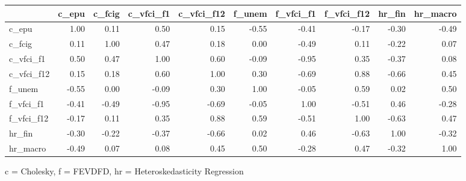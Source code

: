 

\begin{tabular*}{\linewidth}{@{\extracolsep{\fill}}l|rrrrrrrrr}
\toprule
 & c\_epu & c\_fcig & c\_vfci\_f1 & c\_vfci\_f12 & f\_unem & f\_vfci\_f1 & f\_vfci\_f12 & hr\_fin & hr\_macro \\ 
\midrule\addlinespace[2.5pt]
c\_epu & 1.00 & 0.11 & 0.50 & 0.15 & -0.55 & -0.41 & -0.17 & -0.30 & -0.49 \\ 
c\_fcig & 0.11 & 1.00 & 0.47 & 0.18 & 0.00 & -0.49 & 0.11 & -0.22 & 0.07 \\ 
c\_vfci\_f1 & 0.50 & 0.47 & 1.00 & 0.60 & -0.09 & -0.95 & 0.35 & -0.37 & 0.08 \\ 
c\_vfci\_f12 & 0.15 & 0.18 & 0.60 & 1.00 & 0.30 & -0.69 & 0.88 & -0.66 & 0.45 \\ 
f\_unem & -0.55 & 0.00 & -0.09 & 0.30 & 1.00 & -0.05 & 0.59 & 0.02 & 0.50 \\ 
f\_vfci\_f1 & -0.41 & -0.49 & -0.95 & -0.69 & -0.05 & 1.00 & -0.51 & 0.46 & -0.28 \\ 
f\_vfci\_f12 & -0.17 & 0.11 & 0.35 & 0.88 & 0.59 & -0.51 & 1.00 & -0.63 & 0.47 \\ 
hr\_fin & -0.30 & -0.22 & -0.37 & -0.66 & 0.02 & 0.46 & -0.63 & 1.00 & -0.32 \\ 
hr\_macro & -0.49 & 0.07 & 0.08 & 0.45 & 0.50 & -0.28 & 0.47 & -0.32 & 1.00 \\ 
\bottomrule
\end{tabular*}
\begin{minipage}{\linewidth}
c = Cholesky, f = FEVDFD, hr = Heteroskedasticity Regression\\
\end{minipage}


